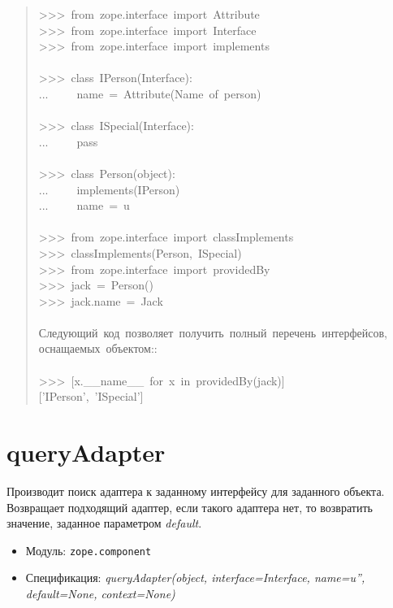 \documentclass[a4paper,openany,twoside,final]{book}
\providecommand*{\DUroletitlereference}[1]{\textsl{#1}}
\begin{document}
\begin{quote}{\ttfamily \raggedright \noindent
>{}>{}>~from~zope.interface~import~Attribute\\
>{}>{}>~from~zope.interface~import~Interface\\
>{}>{}>~from~zope.interface~import~implements\\
~\\
>{}>{}>~class~IPerson(Interface):\\
...~~~~~name~=~Attribute(\textquotedbl{}Name~of~person\textquotedbl{})\\
~\\
>{}>{}>~class~ISpecial(Interface):\\
...~~~~~pass\\
~\\
>{}>{}>~class~Person(object):\\
...~~~~~implements(IPerson)\\
...~~~~~name~=~u\textquotedbl{}\textquotedbl{}\\
~\\
>{}>{}>~from~zope.interface~import~classImplements\\
>{}>{}>~classImplements(Person,~ISpecial)\\
>{}>{}>~from~zope.interface~import~providedBy\\
>{}>{}>~jack~=~Person()\\
>{}>{}>~jack.name~=~\textquotedbl{}Jack\textquotedbl{}\\
~\\
Следующий~код~позволяет~получить~полный~перечень~интерфейсов,\\
оснащаемых~объектом::\\
~\\
>{}>{}>~{[}x.\_\_name\_\_~for~x~in~providedBy(jack){]}\\
{[}'IPerson',~'ISpecial'{]}
}
\end{quote}


\section*{queryAdapter%
  \label{queryadapter}%
}

Производит поиск адаптера к заданному интерфейсу для заданного
объекта.  Возвращает подходящий адаптер, если такого адаптера нет, то
возвратить значение, заданное параметром \DUroletitlereference{default}.

\begin{itemize}

\item Модуль: \texttt{zope.component}

\item Спецификация: \DUroletitlereference{queryAdapter(object, interface=Interface, name=u'',
default=None, context=None)}

\end{itemize}
\end{document}
